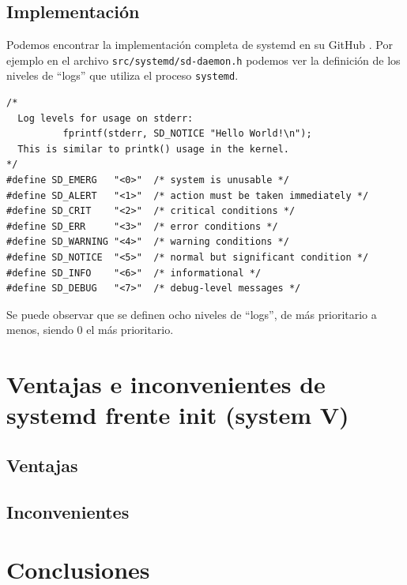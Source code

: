 \subsection{Implementación}

Podemos encontrar la implementación completa de systemd en su GitHub \cite{implementacion_systemd}. Por ejemplo en el archivo \texttt{src/systemd/sd-daemon.h} podemos ver la definición de los niveles de ``logs'' que utiliza el proceso \texttt{systemd}.

\begin{verbatim}
/*
  Log levels for usage on stderr:
          fprintf(stderr, SD_NOTICE "Hello World!\n");
  This is similar to printk() usage in the kernel.
*/
#define SD_EMERG   "<0>"  /* system is unusable */
#define SD_ALERT   "<1>"  /* action must be taken immediately */
#define SD_CRIT    "<2>"  /* critical conditions */
#define SD_ERR     "<3>"  /* error conditions */
#define SD_WARNING "<4>"  /* warning conditions */
#define SD_NOTICE  "<5>"  /* normal but significant condition */
#define SD_INFO    "<6>"  /* informational */
#define SD_DEBUG   "<7>"  /* debug-level messages */
\end{verbatim}

Se puede observar que se definen ocho niveles de ``logs'', de más prioritario a menos, siendo 0 el más prioritario.



\section{Ventajas e inconvenientes de systemd frente init (system V) } 

\subsection{Ventajas}

\subsection{Inconvenientes}

 


\section{Conclusiones} %












